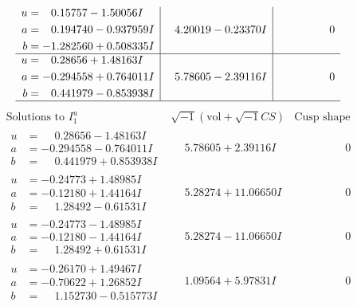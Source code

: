 \documentclass[1p]{elsarticle_modified}
\theoremstyle{definition}
\newcommand{\I}{\sqrt{-1}}
\begin{document}
$$\begin{array}{c|c|c}
\begin{aligned}
u &= \phantom{-}0.15757 - 1.50056 I \\
a &= \phantom{-}0.194740 - 0.937959 I \\
b &= -1.282560 + 0.508335 I\end{aligned}
 & \phantom{-}4.20019 - 0.23370 I & \phantom{-0.000000 } 0 \\ \hline\begin{aligned}
u &= \phantom{-}0.28656 + 1.48163 I \\
a &= -0.294558 + 0.764011 I \\
b &= \phantom{-}0.441979 - 0.853938 I\end{aligned}
 & \phantom{-}5.78605 - 2.39116 I & \phantom{-0.000000 } 0\\
 \hline 
 \end{array}$$\newpage$$\begin{array}{c|c|c}  
\text{Solutions to }I^u_{1}& \I (\text{vol} + \sqrt{-1}CS) & \text{Cusp shape}\\
 \hline 
\begin{aligned}
u &= \phantom{-}0.28656 - 1.48163 I \\
a &= -0.294558 - 0.764011 I \\
b &= \phantom{-}0.441979 + 0.853938 I\end{aligned}
 & \phantom{-}5.78605 + 2.39116 I & \phantom{-0.000000 } 0 \\ \hline\begin{aligned}
u &= -0.24773 + 1.48985 I \\
a &= -0.12180 + 1.44164 I \\
b &= \phantom{-}1.28492 - 0.61531 I\end{aligned}
 & \phantom{-}5.28274 + 11.06650 I & \phantom{-0.000000 } 0 \\ \hline\begin{aligned}
u &= -0.24773 - 1.48985 I \\
a &= -0.12180 - 1.44164 I \\
b &= \phantom{-}1.28492 + 0.61531 I\end{aligned}
 & \phantom{-}5.28274 - 11.06650 I & \phantom{-0.000000 } 0 \\ \hline\begin{aligned}
u &= -0.26170 + 1.49467 I \\
a &= -0.70622 + 1.26852 I \\
b &= \phantom{-}1.152730 - 0.515773 I\end{aligned}
 & \phantom{-}1.09564 + 5.97831 I & \phantom{-0.000000 } 0 \\ \hline\begin{aligned}

\end{aligned}
\end{array}$$
\end{document}
